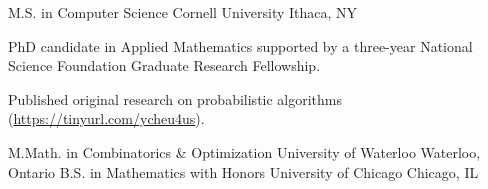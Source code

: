

\begin{cventries}

  \cventry
    {M.S. in Computer Science} %
    {Cornell University} %
    {Ithaca, NY} %
    {} %
    {
      \begin{cvitems} %
        \item {PhD candidate in Applied Mathematics supported by a three-year National Science Foundation Graduate Research Fellowship.}
        \item {Published original research on probabilistic algorithms (\url{https://tinyurl.com/ycheu4us}).}
      \end{cvitems}
    }

  \cventry
    {M.Math. in Combinatorics \& Optimization} %
    {University of Waterloo} %
    {Waterloo, Ontario} %
    {} %
    {}
  \vspace{-1.0mm}
  \cventry
    {B.S. in Mathematics with Honors} %
    {University of Chicago} %
    {Chicago, IL} %
    {} %
    {}
  \vspace{-1.0mm}
\end{cventries}
